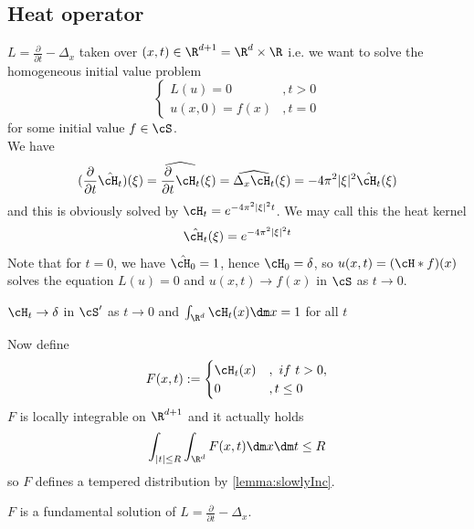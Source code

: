\subsection{Heat operator}
$L = \frac{\partial}{\partial t} - \Delta_x$
taken over $(x,t) \in \R^{d+1} = \R^d \times \R$
i.e. we want to solve the homogeneous initial value problem
\[
\begin{cases}
	L (u) = 0 & , t > 0 \\
	u(x,0) = f(x) & , t = 0
\end{cases}
\]
for some initial value $f \in \cS$. \\
We have
\[
(\frac{\partial}{\partial t} \hat {\cH_t})(\xi) = \widehat{\frac{\partial}{\partial t} \cH_t}(\xi) = \widehat{\Delta_x \cH_t}(\xi) = -4\pi^2 |\xi|^2 \hat {\cH_t} (\xi)
\]
and this is obviously solved by $\cH_t = e^{-4\pi^2 |\xi|^2 t}$. We may call this the heat kernel
\[
\hat{\cH_t}(\xi) = e^{-4\pi^2 |\xi|^2 t}
\]
Note that for $t = 0$, we have $\hat{\cH_0} = 1$, hence $\cH_0  = \delta$, so $u(x,t) = (\cH * f)(x)$ solves the equation $L(u) = 0$ and $u(x,t) \to f(x)$ in $\cS$ as $t \to 0$.
\begin{remark}{\label{remark:approxId}}
	$\cH_t \to \delta$ in $\cS'$ as $t \to 0$ and $\int_{\R^d} \cH_t(x) \dm x = 1$ for all $t$
\end{remark}
Now define
\[
F(x,t) := \begin{cases}
	\cH_t(x) & , \ if  \ t > 0 , \\
	0 & , t \le 0
\end{cases}
\]
$F$ is locally integrable on $\R^{d+1}$ and it actually holds
\[
\int_{|t|\le R} \int_{\R^d} F(x,t) \dm x \dm t \le R
\]
so $F$ defines a tempered distribution by \ref{lemma:slowlyInc}.
\begin{theorem}
	$F$ is a fundamental solution of $L =  \frac{\partial}{\partial t} - \Delta_x$.
\end{theorem}
